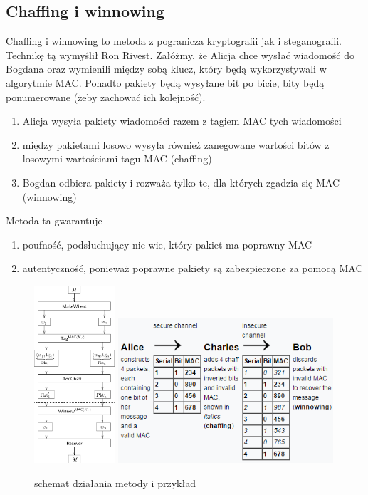 \documentclass{article}
\begin{document}
\subsection{Chaffing i winnowing}
Chaffing i winnowing to metoda z pogranicza kryptografii jak i steganografii. Technikę tą wymyślił Ron Rivest. Załóżmy, że Alicja chce wysłać wiadomość do Bogdana
oraz wymienili między sobą klucz, który będą wykorzystywali w algorytmie MAC. Ponadto pakiety będą wysyłane bit po bicie, bity będą ponumerowane (żeby zachować ich kolejność).
\begin{enumerate}
	\item Alicja wysyła pakiety wiadomości razem z tagiem MAC tych wiadomości
	\item między pakietami losowo wysyła również zanegowane wartości bitów z losowymi wartościami tagu MAC (chaffing)
	\item Bogdan odbiera pakiety i rozważa tylko te, dla których zgadzia się MAC (winnowing)
\end{enumerate}
Metoda ta gwarantuje
\begin{enumerate}
	\item poufność, podsłuchujący nie wie, który pakiet ma poprawny MAC
	\item autentyczność, ponieważ poprawne pakiety są zabezpieczone za pomocą MAC
\end{enumerate}
\begin{figure}[H]
	\centering
	\includegraphics[width=3cm]{chaffingwinnowing}
	\includegraphics[width=8cm]{chaffingwinnowing2}
	\caption{schemat działania metody i przykład}
\end{figure}
\end{document}
